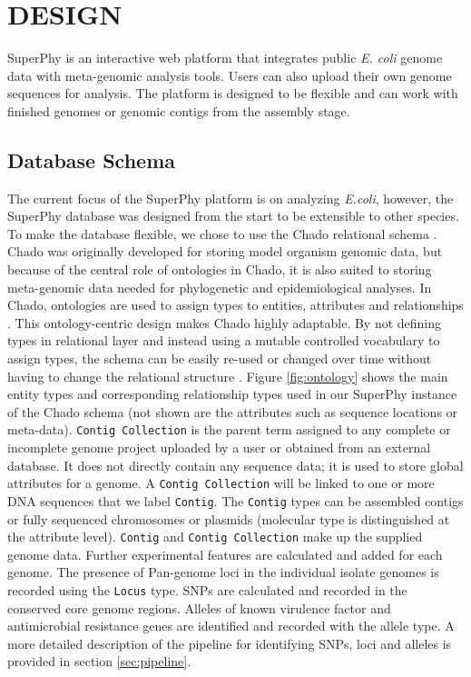 \documentclass[a4paper,twoside]{article}
\begin{document}
\section{\uppercase{Design}}
\label{sec:design}

\noindent SuperPhy is an interactive web platform that integrates public \textit{E. coli} genome data with meta-genomic analysis tools.  Users can also upload their own genome sequences for analysis.  The platform is designed to be flexible and can work with finished genomes or genomic contigs from the assembly stage. 

\subsection{Database Schema}

The current focus of the SuperPhy platform is on analyzing \textit{E.coli}, however, the SuperPhy database was designed from the start to be extensible to other species. To make the database flexible, we chose to use the Chado relational schema \cite{mungall2007chado}. Chado was originally developed for storing model organism genomic data, but because of the central role of ontologies in Chado, it is also suited to storing meta-genomic data needed for phylogenetic and epidemiological analyses. In Chado, ontologies are used to assign types to entities, attributes and relationships \cite{mungall2007chado}. This ontology-centric design makes Chado highly adaptable. By not defining types in relational layer and instead using a mutable controlled vocabulary to assign types, the schema can be easily re-used or changed over time without having to change the relational structure \cite{mungall2007chado}.  Figure \ref{fig:ontology} shows the main entity types and corresponding relationship types used in our SuperPhy instance of the Chado schema (not shown are the attributes such as sequence locations or  meta-data). \texttt{Contig Collection} is the parent term assigned to any complete or incomplete genome project uploaded by a user or obtained from an external database.  It does not directly contain any sequence data; it is used to store global attributes for a genome. A \texttt{Contig Collection} will be linked to one or more DNA sequences that we label \texttt{Contig}. The \texttt{Contig} types can be assembled contigs or fully sequenced chromosomes or plasmids (molecular type is distinguished at the attribute level). \texttt{Contig} and \texttt{Contig Collection} make up the supplied genome data. Further experimental features are calculated and added for each genome. The presence of Pan-genome loci in the individual isolate genomes is recorded using the \texttt{Locus} type. SNPs are calculated and recorded in the conserved core genome regions. Alleles of known virulence factor and antimicrobial resistance genes are identified and recorded with the allele type.  A more detailed description of the pipeline for identifying SNPs, loci and alleles is provided in section \ref{sec:pipeline}.
\end{document}

